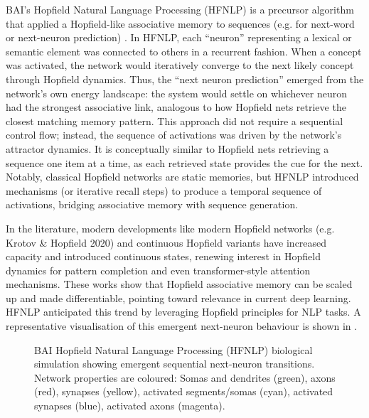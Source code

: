 BAI’s Hopfield Natural Language Processing (HFNLP) is a precursor algorithm that applied a Hopfield-like associative memory to sequences (e.g. for next-word or next-neuron prediction) \citep{bairesearch2024HFNLPpy}.
In HFNLP, each ``neuron'' representing a lexical or semantic element was connected to others in a recurrent fashion.
When a concept was activated, the network would iteratively converge to the next likely concept through Hopfield dynamics.
Thus, the ``next neuron prediction'' emerged from the network’s own energy landscape: the system would settle on whichever neuron had the strongest associative link, analogous to how Hopfield nets retrieve the closest matching memory pattern.
This approach did not require a sequential control flow; instead, the sequence of activations was driven by the network’s attractor dynamics.
It is conceptually similar to Hopfield nets retrieving a sequence one item at a time, as each retrieved state provides the cue for the next.
Notably, classical Hopfield networks are static memories, but HFNLP introduced mechanisms (or iterative recall steps) to produce a temporal sequence of activations, bridging associative memory with sequence generation.

In the literature, modern developments like modern Hopfield networks (e.g. Krotov \& Hopfield 2020) and continuous Hopfield variants have increased capacity and introduced continuous states, renewing interest in Hopfield dynamics for pattern completion and even transformer-style attention mechanisms.
These works show that Hopfield associative memory can be scaled up and made differentiable, pointing toward relevance in current deep learning.
HFNLP anticipated this trend by leveraging Hopfield principles for NLP tasks.
A representative visualisation of this emergent next-neuron behaviour is shown in .

\begin{figure}[htbp]
\centering

\caption{BAI Hopfield Natural Language Processing (HFNLP) biological simulation showing emergent sequential next-neuron transitions. Network properties are coloured: Somas and dendrites (green), axons (red), synapses (yellow), activated segments/somas (cyan), activated synapses (blue), activated axons (magenta).}
\label{fig:intro-hopfield-emergent-sequence-prediction}
\end{figure}

